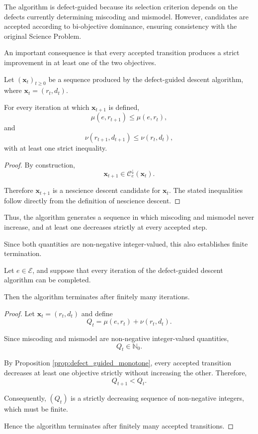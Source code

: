 The algorithm is defect-guided because its selection
criterion depends on the defects currently determining
miscoding and mismodel. However, candidates are accepted
according to bi-objective dominance, ensuring consistency
with the original Science Problem.

An important consequence is that every accepted
transition produces a strict improvement in at least
one of the two objectives.

\begin{proposition}
\label{prop:defect_guided_monotone}
Let $(\mathbf{x}_t)_{t\geq0}$ be a sequence
produced by the defect-guided descent algorithm,
where $\mathbf{x}_t=(r_t,d_t)$.

For every iteration at which $\mathbf{x}_{t+1}$
is defined,
\[
\mu(e,r_{t+1})\leq\mu(e,r_t),
\]
and
\[
\nu(r_{t+1},d_{t+1})
\leq
\nu(r_t,d_t),
\]
with at least one strict inequality.
\end{proposition}

\begin{proof}
By construction,
\[
\mathbf{x}_{t+1}
\in
\mathcal C_e^\downarrow(\mathbf{x}_t).
\]

Therefore $\mathbf{x}_{t+1}$ is a nescience
descent candidate for $\mathbf{x}_t$.
The stated inequalities follow directly
from the definition of nescience descent.
\end{proof}

Thus, the algorithm generates a sequence in which
miscoding and mismodel never increase, and at least
one decreases strictly at every accepted step.

Since both quantities are non-negative integer-valued,
this also establishes finite termination.

\begin{proposition}
\label{prop:defect_guided_finite_termination}
Let $e\in\mathcal E$, and suppose that every
iteration of the defect-guided descent algorithm
can be completed.

Then the algorithm terminates after finitely
many iterations.
\end{proposition}

\begin{proof}
Let $\mathbf{x}_t=(r_t,d_t)$ and define
\[
Q_t
=
\mu(e,r_t)+\nu(r_t,d_t).
\]

Since miscoding and mismodel are non-negative
integer-valued quantities,
\[
Q_t\in\mathbb N_0.
\]

By Proposition \ref{prop:defect_guided_monotone},
every accepted transition decreases at least
one objective strictly without increasing the other.
Therefore,
\[
Q_{t+1}<Q_t.
\]

Consequently, $(Q_t)$ is a strictly decreasing
sequence of non-negative integers, which must
be finite.

Hence the algorithm terminates after finitely
many accepted transitions.
\end{proof}

